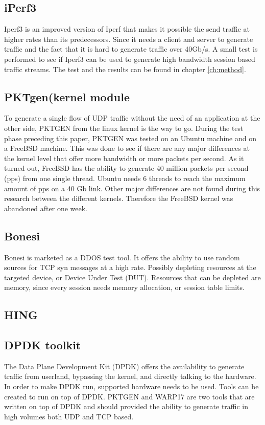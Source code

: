 \subsection{iPerf3}\label{sub:iperf3}
Iperf3 is an improved version of Iperf that makes it possible the send traffic at higher rates than its predecessors. Since it needs a client and server to generate traffic and the fact that it is hard to generate traffic over 40Gb/s. A small test is performed to see if Iperf3 can be used to generate high bandwidth session based traffic streams. The test and the results can be found in chapter \ref{ch:method}. 

\subsection{PKTgen(kernel module}\label{sub:pktgen}
To generate a single flow of UDP traffic without the need of an application at the other side, PKTGEN from the linux kernel is the way to go. During the test phase preceding this paper, PKTGEN was tested on an Ubuntu machine and on a FreeBSD machine. 
This was done to see if there are any major differences at the kernel level that offer more bandwidth or more packets per second. As it turned out, FreeBSD has the ability to generate 40 million packets per second (pps) from one single thread. Ubuntu needs 6 threads to reach the maximum amount of pps on a 40 Gb link. Other major differences are not found during this research between the different kernels. Therefore the FreeBSD kernel was abandoned after one week. 

\subsection{Bonesi}\label{sub:bonesi}
Bonesi is marketed as a DDOS test tool. It offers the ability to use random sources for TCP syn messages at a high rate. Possibly depleting resources at the targeted device, or Device Under Test (DUT). Resources that can be depleted are memory, since every session needs memory allocation, or session table limits.  

\subsection{HING}\label{sub:hping}


\subsection{DPDK toolkit}\label{sub:dpdk}
The Data Plane Development Kit (DPDK) offers the availability to generate traffic from userland, bypassing the kernel, and directly talking to the hardware. In order to make DPDK run, supported hardware needs to be used. Tools can be created to run on top of DPDK. PKTGEN and WARP17 are two tools that are written on top of DPDK and should provided the ability to generate traffic in high volumes both UDP and TCP based.  

